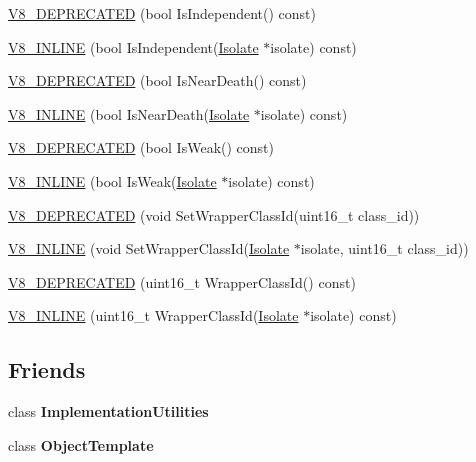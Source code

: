\begin{DoxyCompactItemize}
\item 
\hyperlink{classv8_1_1_persistent_a062c7cbd52ff6036a2c684bfaf519328}{V8\+\_\+\+D\+E\+P\+R\+E\+C\+A\+T\+E\+D} (bool Is\+Independent() const)
\item 
\hyperlink{classv8_1_1_persistent_a0cb1529e8138c0072f6efac79056e225}{V8\+\_\+\+I\+N\+L\+I\+N\+E} (bool Is\+Independent(\hyperlink{classv8_1_1_isolate}{Isolate} $\ast$isolate) const)
\item 
\hyperlink{classv8_1_1_persistent_ac18225b7aa0526e91ec79fefc15cf083}{V8\+\_\+\+D\+E\+P\+R\+E\+C\+A\+T\+E\+D} (bool Is\+Near\+Death() const)
\item 
\hyperlink{classv8_1_1_persistent_af76521b3119940e7200fd12ea6aac533}{V8\+\_\+\+I\+N\+L\+I\+N\+E} (bool Is\+Near\+Death(\hyperlink{classv8_1_1_isolate}{Isolate} $\ast$isolate) const)
\item 
\hyperlink{classv8_1_1_persistent_a84eacd9d2d462765dd7dd4a65c317d5a}{V8\+\_\+\+D\+E\+P\+R\+E\+C\+A\+T\+E\+D} (bool Is\+Weak() const)
\item 
\hyperlink{classv8_1_1_persistent_acfa08355e94e227b6319123d40cd8710}{V8\+\_\+\+I\+N\+L\+I\+N\+E} (bool Is\+Weak(\hyperlink{classv8_1_1_isolate}{Isolate} $\ast$isolate) const)
\item 
\hyperlink{classv8_1_1_persistent_a22e3ebfbe9827b1dab8b7163c95a304d}{V8\+\_\+\+D\+E\+P\+R\+E\+C\+A\+T\+E\+D} (void Set\+Wrapper\+Class\+Id(uint16\+\_\+t class\+\_\+id))
\item 
\hyperlink{classv8_1_1_persistent_a929e7d86fc54c414931805e01e3af9e4}{V8\+\_\+\+I\+N\+L\+I\+N\+E} (void Set\+Wrapper\+Class\+Id(\hyperlink{classv8_1_1_isolate}{Isolate} $\ast$isolate, uint16\+\_\+t class\+\_\+id))
\item 
\hyperlink{classv8_1_1_persistent_a924fe9b886aa271ea898272b40cd64ca}{V8\+\_\+\+D\+E\+P\+R\+E\+C\+A\+T\+E\+D} (uint16\+\_\+t Wrapper\+Class\+Id() const)
\item 
\hyperlink{classv8_1_1_persistent_a212b9d40b2152e00fe9e7e028c296fea}{V8\+\_\+\+I\+N\+L\+I\+N\+E} (uint16\+\_\+t Wrapper\+Class\+Id(\hyperlink{classv8_1_1_isolate}{Isolate} $\ast$isolate) const)
\end{DoxyCompactItemize}
\subsection*{Friends}
\begin{DoxyCompactItemize}
\item 
\hypertarget{classv8_1_1_persistent_ac7b520085953e146d849e05253267f72}{}class {\bfseries Implementation\+Utilities}\label{classv8_1_1_persistent_ac7b520085953e146d849e05253267f72}

\item 
\hypertarget{classv8_1_1_persistent_a4d28646409234f556983be8a96c06424}{}class {\bfseries Object\+Template}\label{classv8_1_1_persistent_a4d28646409234f556983be8a96c06424}

\end{DoxyCompactItemize}


